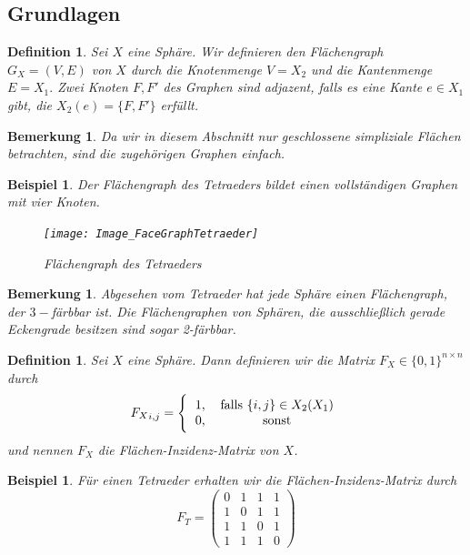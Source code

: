 \documentclass[12pt,titlepage,twoside,cleardoublepage]{article}
\theoremstyle{nummermitklammern}
\newtheorem{bsp}[temp]{Beispiel}
\newtheorem{definition}[temp]{Definition}
\newtheorem{bemerkung}[temp]{Bemerkung}
\newtheorem{definition}[zahl]{Definition}
\newtheorem{bsp}[zahl]{Beispiel}
\newtheorem{bemerkung}[zahl]{Bemerkung}
\numberwithin{equation}{section}
\begin{document}
\subsection{Grundlagen}
\begin{definition}
Sei $X$ eine Sphäre. Wir definieren den Flächengraph $G_X=(V,E)$ von $X$ durch die Knotenmenge $V=X_2$ und die Kantenmenge $E=X_1.$ Zwei Knoten $F,F'$ des Graphen sind adjazent, falls es eine Kante $e\in X_1$ gibt, die $X_2(e)=\{F,F'\}$ erfüllt. 
\end{definition}
\begin{bemerkung}
Da wir in diesem Abschnitt nur geschlossene simpliziale Flächen betrachten, sind die zugehörigen Graphen einfach. 
\end{bemerkung}
\begin{bsp}
Der Flächengraph des Tetraeders bildet einen vollständigen Graphen mit vier Knoten.
\begin{figure}[H]
\begin{center}
\texttt{[image: Image\_FaceGraphTetraeder]}
\end{center}
\caption{Flächengraph des Tetraeders}
\end{figure}
\end{bsp}
\begin{bemerkung}
Abgesehen vom Tetraeder hat jede Sphäre einen  Flächengraph, der $3-$färbbar ist. Die Flächengraphen von Sphären, die ausschließlich gerade Eckengrade besitzen sind sogar 2-färbbar.
\end{bemerkung}
\begin{definition}
Sei $X$ eine Sphäre. Dann definieren wir die Matrix 
$F_X\in \{0,1\}^{n \times n}$ durch
\[
{F_X}_{i,j}=
\Biggl\{
\begin{tabular}[l]{lcr}
1,&\textcolor{black}{falls $\{i,j\}\in X_2(X_1)$} \\
0,& sonst\\
\end{tabular}
\] und nennen $F_X$ die Flächen-Inzidenz-Matrix von $X$. 
\end{definition}
\begin{bsp}
Für einen Tetraeder erhalten wir die Flächen-Inzidenz-Matrix  durch  
\[
F_T=
\left( \begin{array}{rrrrrrrr}
0 & 1 & 1 & 1 \\ 
1 & 0 & 1 & 1 \\
1 & 1 & 0 & 1 \\
1 & 1 & 1 & 0  
\end{array}
\right)
\]

\end{bsp}
\end{document}
